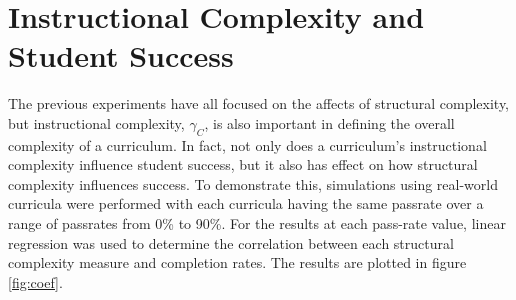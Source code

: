 \documentclass[botnum, fleqn]{unmeethesis}
\begin{document}





  \section{Instructional Complexity and Student Success}
    The previous experiments have all focused on the affects of structural complexity, but instructional complexity, $\gamma_C$, is also important in defining the overall complexity of a curriculum. In fact, not only does a curriculum's instructional complexity influence student success, but it also has effect on how structural complexity influences success. To demonstrate this, simulations using real-world curricula were performed with each curricula having the same passrate over a range of passrates from 0\% to 90\%. For the results at each pass-rate value, linear regression was used to determine the correlation between each structural complexity measure and completion rates. The results are plotted in figure \ref{fig:coef}.
\end{document}

